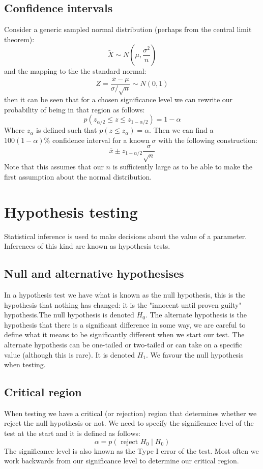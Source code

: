 \documentclass[12pt]{article}
\begin{document}
\subsection*{Confidence intervals}
Consider a generic sampled normal distribution (perhaps from the central limit theorem):
\[\tilde{X}\sim N(\mu, \frac{\sigma^2}{n})\]
and the mapping to the the standard normal:
\[Z=\frac{\bar{x}-\mu}{\sigma/\sqrt{n}}\sim N(0,1)\]
then it can be seen that for a chosen significance level we can rewrite our probability of being in that region as follows:
\[p(z_{\alpha/2}\leq z\leq z_{1-\alpha/2})=1-\alpha\]
Where \(z_\alpha\) is defined such that \(p(z\leq z_\alpha)=\alpha\). Then we can find a \(100(1-\alpha)\%\) confidence interval for a known \(\sigma\) with the following construction:
\[\bar{x}\pm z_{1-\alpha/2}\frac{\sigma}{\sqrt{n}}\]
Note that this assumes that our \(n\) is sufficiently large as to be able to make the first assumption about the normal distribution.
\section{Hypothesis testing}
Statistical inference is used to make decisions about the value of a parameter. Inferences of this kind are known as hypothesis tests.
\subsection*{Null and alternative hypothesises}
In a hypothesis test we have what is known as the null hypothesis, this is the hypothesis that nothing has changed: it is the "innocent until proven guilty" hypothesis.The null hypothesis is denoted \(H_0\). The alternate hypothesis is the hypothesis that there is a significant difference in some way, we are careful to define what it means to be significantly different when we start our test. The alternate hypothesis can be one-tailed or two-tailed or can take on a specific value (although this is rare). It is denoted \(H_1\). We favour the null hypothesis when testing.
\subsection*{Critical region}
When testing we have a critical (or rejection) region that determines whether we reject the null hypothesis or not. We need to specify the significance level of the test at the start and it is defined as follows:
\[\alpha=p(\text{ reject } H_0 \mid H_0)\]
The significance level is also known as the Type I error of the test. Most often we work backwards from our significance level to determine our critical region.
\end{document}

